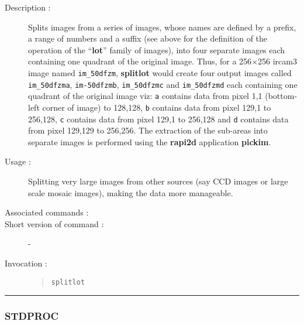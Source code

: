 \begin{description}

\item[Description :] Splits images from a series of images,
whose names are defined by a prefix, a range of numbers and a suffix
(see above for the definition of the operation of the ``{\bf lot}''
family of images), into four separate images each containing one
quadrant of the original image. Thus, for a 256$\times$256 {\sc ircam3}
image named {\tt im\_50dfzm}, {\bf splitlot} would create four output
images called {\tt im\_50dfzma}, {\tt im-50dfzmb}, {\tt im\_50dfzmc}
and {\tt im\_50dfzmd} each containing one quadrant of the original
image viz: {\tt a} contains data from pixel 1,1 (bottom-left corner of
image) to 128,128, {\tt b} contains data from pixel 129,1 to 256,128,
{\tt c} contains data from pixel 129,1 to 256,128 and {\tt d} contains
data from pixel 129,129 to 256,256.  The extraction of the sub-areas
into separate images is performed using the {\bf rapi2d} application
{\bf pickim}.

\item[Usage :] Splitting very large images from other sources
(say CCD images or large scale mosaic images), making the data more
manageable.

\item[Associated commands :] {\tt {}}
\item[Short version of command :] -
\item[Invocation :]

\begin{quote}{\tt  splitlot }\end{quote}

\end{description}

\hrule 
\subsubsection*{\label{STDPROC}STDPROC}

